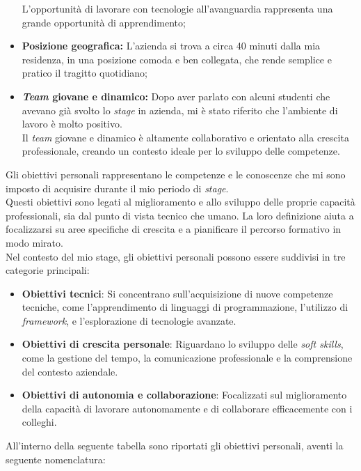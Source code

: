 \begin{itemize}
    L'opportunità di lavorare con tecnologie all'avanguardia rappresenta una grande opportunità di apprendimento;
    \item \textbf{Posizione geografica:} L'azienda si trova a circa 40 minuti dalla mia residenza, in una posizione comoda e ben collegata, che rende semplice e pratico il tragitto quotidiano;
    \pagebreak
    \item \textbf{\textit{Team} giovane e dinamico:} Dopo aver parlato con alcuni studenti che avevano già svolto lo \textit{stage} in azienda, mi è stato riferito che l'ambiente di lavoro è molto positivo.\\
    Il \textit{team} giovane e dinamico è altamente collaborativo e orientato alla crescita professionale, creando un contesto ideale per lo sviluppo delle competenze.
\end{itemize}


\noindent Gli obiettivi personali rappresentano le competenze e le conoscenze che mi sono imposto di acquisire durante il mio periodo di \textit{stage}.\\

\noindent Questi obiettivi sono legati al miglioramento e allo sviluppo delle proprie capacità professionali, sia dal punto di vista tecnico che umano.
La loro definizione aiuta a focalizzarsi su aree specifiche di crescita e a pianificare il percorso formativo in modo mirato. \\

\noindent Nel contesto del mio stage, gli obiettivi personali possono essere suddivisi in tre categorie principali:

\begin{itemize}
    \item \textbf{Obiettivi tecnici}: Si concentrano sull'acquisizione di nuove competenze tecniche, come l'apprendimento di linguaggi di programmazione, l'utilizzo di \textit{framework}, e l'esplorazione di tecnologie avanzate.
    \item \textbf{Obiettivi di crescita personale}: Riguardano lo sviluppo delle \textit{soft skills}, come la gestione del tempo, la comunicazione professionale e la comprensione del contesto aziendale.
    \item \textbf{Obiettivi di autonomia e collaborazione}: Focalizzati sul miglioramento della capacità di lavorare autonomamente e di collaborare efficacemente con i colleghi.
\end{itemize}

\noindent All'interno della seguente tabella sono riportati gli obiettivi personali, aventi la seguente nomenclatura:

